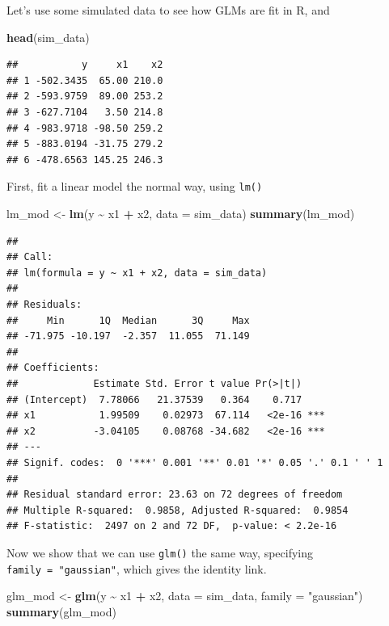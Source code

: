 \documentclass[
]{book}
\newenvironment{Shaded}{\begin{snugshade}}{\end{snugshade}}
\newcommand{\DataTypeTok}[1]{\textcolor[rgb]{0.13,0.29,0.53}{#1}}
\newcommand{\KeywordTok}[1]{\textcolor[rgb]{0.13,0.29,0.53}{\textbf{#1}}}
\newcommand{\NormalTok}[1]{#1}
\newcommand{\OperatorTok}[1]{\textcolor[rgb]{0.81,0.36,0.00}{\textbf{#1}}}
\newcommand{\StringTok}[1]{\textcolor[rgb]{0.31,0.60,0.02}{#1}}
\begin{document}
Let's use some simulated data to see how GLMs are fit in R, and

\begin{Shaded}
\begin{Highlighting}[]
\KeywordTok{head}\NormalTok{(sim\_data)}
\end{Highlighting}
\end{Shaded}

\begin{verbatim}
##           y     x1    x2
## 1 -502.3435  65.00 210.0
## 2 -593.9759  89.00 253.2
## 3 -627.7104   3.50 214.8
## 4 -983.9718 -98.50 259.2
## 5 -883.0194 -31.75 279.2
## 6 -478.6563 145.25 246.3
\end{verbatim}

First, fit a linear model the normal way, using \texttt{lm()}

\begin{Shaded}
\begin{Highlighting}[]
\NormalTok{lm\_mod \textless{}{-}}\StringTok{ }\KeywordTok{lm}\NormalTok{(y }\OperatorTok{\textasciitilde{}}\StringTok{ }\NormalTok{x1 }\OperatorTok{+}\StringTok{ }\NormalTok{x2, }\DataTypeTok{data =}\NormalTok{ sim\_data)}
\KeywordTok{summary}\NormalTok{(lm\_mod)}
\end{Highlighting}
\end{Shaded}

\begin{verbatim}
## 
## Call:
## lm(formula = y ~ x1 + x2, data = sim_data)
## 
## Residuals:
##     Min      1Q  Median      3Q     Max 
## -71.975 -10.197  -2.357  11.055  71.149 
## 
## Coefficients:
##             Estimate Std. Error t value Pr(>|t|)    
## (Intercept)  7.78066   21.37539   0.364    0.717    
## x1           1.99509    0.02973  67.114   <2e-16 ***
## x2          -3.04105    0.08768 -34.682   <2e-16 ***
## ---
## Signif. codes:  0 '***' 0.001 '**' 0.01 '*' 0.05 '.' 0.1 ' ' 1
## 
## Residual standard error: 23.63 on 72 degrees of freedom
## Multiple R-squared:  0.9858, Adjusted R-squared:  0.9854 
## F-statistic:  2497 on 2 and 72 DF,  p-value: < 2.2e-16
\end{verbatim}

Now we show that we can use \texttt{glm()} the same way, specifying \texttt{family\ =\ "gaussian"}, which gives the identity link.

\begin{Shaded}
\begin{Highlighting}[]
\NormalTok{glm\_mod \textless{}{-}}\StringTok{ }\KeywordTok{glm}\NormalTok{(y }\OperatorTok{\textasciitilde{}}\StringTok{ }\NormalTok{x1 }\OperatorTok{+}\StringTok{ }\NormalTok{x2, }\DataTypeTok{data =}\NormalTok{ sim\_data, }\DataTypeTok{family =} \StringTok{"gaussian"}\NormalTok{)}
\KeywordTok{summary}\NormalTok{(glm\_mod)}
\end{Highlighting}
\end{Shaded}
\end{document}
